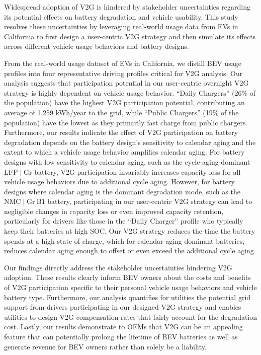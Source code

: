\documentclass[pdflatex,sn-nature]{sn-jnl}%
\theoremstyle{thmstyleone}%
\theoremstyle{thmstyletwo}%
\theoremstyle{thmstylethree}%
\begin{document}

Widespread adoption of V2G is hindered by stakeholder uncertainties regarding its potential effects on battery degradation and vehicle usability. This study resolves these uncertainties by leveraging real-world usage data from EVs in California to first design a user-centric V2G strategy and then simulate its effects across different vehicle usage behaviors and battery designs.

From the real-world usage dataset of EVs in California, we distill BEV usage profiles into four representative driving profiles critical for V2G analysis. Our analysis suggests that participation potential in our user-centric overnight V2G strategy is highly dependent on vehicle usage behavior. ``Daily Chargers'' (26\% of the population) have the highest V2G participation potential, contributing an average of 1,259 kWh/year to the grid, while ``Public Chargers'' (19\% of the population) have the lowest as they primarily fast charge from public chargers. Furthermore, our results indicate the effect of V2G participation on battery degradation depends on the battery design’s sensitivity to calendar aging and the extent to which a vehicle usage behavior amplifies calendar aging. For battery designs with low sensitivity to calendar aging, such as the cycle-aging-dominant $\mathrm{LFP}\mid\mathrm{Gr}$ battery, V2G participation invariably increases capacity loss for all vehicle usage behaviors due to additional cycle aging. However, for battery designs where calendar aging is the dominant degradation mode, such as the $\mathrm{NMC}\mid\mathrm{Gr~B1}$ battery, participating in our user-centric V2G strategy can lead to negligible changes in capacity loss or even improved capacity retention, particularly for drivers like those in the ``Daily Charger'' profile who typically keep their batteries at high SOC. Our V2G strategy reduces the time the battery spends at a high state of charge, which for calendar-aging-dominant batteries, reduces calendar aging enough to offset or even exceed the additional cycle aging.

Our findings directly address the stakeholder uncertainties hindering V2G adoption. These results clearly inform BEV owners about the costs and benefits of V2G participation specific to their personal vehicle usage behaviors and vehicle battery type. Furthermore, our analysis quantifies for utilities the potential grid support from drivers participating in our designed V2G strategy and enables utilities to design V2G compensation rates that fairly account for the degradation cost. Lastly, our results demonstrate to OEMs that V2G can be an appealing feature that can potentially prolong the lifetime of BEV batteries as well as generate revenue for BEV owners rather than solely be a liability.
\end{document}
